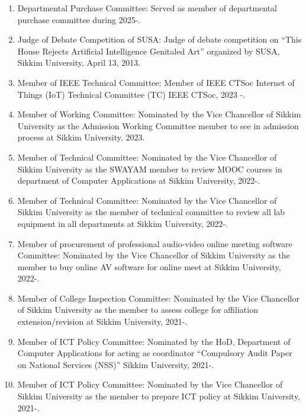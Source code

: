 \documentclass[11pt,a4paper]{moderncv}
\begin{document}
\begin{adjustwidth}{6em}{0pt}
	\begin{enumerate}
		\item Departmental Purchase Committee: Served as member of departmental purchase committee during 2025-.
		
		\item Judge of Debate Competition of SUSA: Judge of debate competition on “This House Rejects Artificial Intelligence Genitaled Art” organized by SUSA, Sikkim University, April 13, 2013.
		
		\item Member of IEEE Technical Committee: Member of IEEE CTSoc Internet of Things (IoT) Technical Committee (TC) IEEE CTSoc, 2023 -.
		
		\item Member of Working Committee: Nominated by the Vice Chancellor of Sikkim University as the Admission Working Committee member to see in admission process at Sikkim University, 2023.
		
		\item Member of Technical Committee: Nominated by the Vice Chancellor of Sikkim University as the SWAYAM member to review MOOC courses in department of Computer Applications at Sikkim University, 2022-.
		
		\item Member of Technical Committee: Nominated by the Vice Chancellor of Sikkim University as the member of technical committee to review all lab equipment in all departments at Sikkim University, 2022-.
		
		\item Member of procurement of professional audio-video online meeting software Committee: Nominated by the Vice Chancellor of Sikkim University as the member to buy online AV software for online meet at Sikkim University, 2022-.
		
		\item Member of College Inspection Committee: Nominated by the Vice Chancellor of Sikkim University as the member to assess college for affiliation extension/revision at Sikkim University, 2021-.
		
		\item Member of ICT Policy Committee: Nominated by the HoD, Department of Computer Applications for acting as coordinator “Compulsory Audit Paper on National Services (NSS)” Sikkim University, 2021-.
		
		\item Member of ICT Policy Committee: Nominated by the Vice Chancellor of Sikkim University as the member to prepare ICT policy at Sikkim University, 2021-.
		

\end{enumerate}
\end{adjustwidth}
\end{document}
